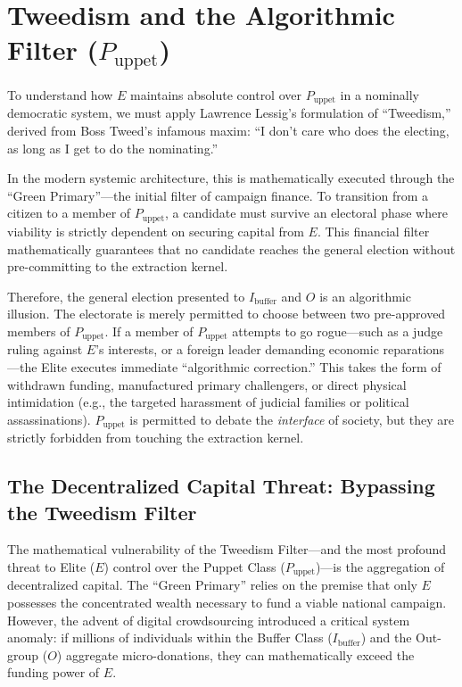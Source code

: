 \documentclass[12pt,openany]{book}
\begin{document}
\section{Tweedism and the Algorithmic Filter (\texorpdfstring{$P_{\text{uppet}}$}{P\_uppet})}

To understand how $E$ maintains absolute control over $P_{\text{uppet}}$ in a nominally democratic system, we must apply Lawrence Lessig's formulation of ``Tweedism,'' derived from Boss Tweed's infamous maxim: ``I don't care who does the electing, as long as I get to do the nominating.''

In the modern systemic architecture, this is mathematically executed through the ``Green Primary''---the initial filter of campaign finance. To transition from a citizen to a member of $P_{\text{uppet}}$, a candidate must survive an electoral phase where viability is strictly dependent on securing capital from $E$. This financial filter mathematically guarantees that no candidate reaches the general election without pre-committing to the extraction kernel.

Therefore, the general election presented to $I_{\text{buffer}}$ and $O$ is an algorithmic illusion. The electorate is merely permitted to choose between two pre-approved members of $P_{\text{uppet}}$. If a member of $P_{\text{uppet}}$ attempts to go rogue---such as a judge ruling against $E$'s interests, or a foreign leader demanding economic reparations---the Elite executes immediate ``algorithmic correction.'' This takes the form of withdrawn funding, manufactured primary challengers, or direct physical intimidation (e.g., the targeted harassment of judicial families or political assassinations). $P_{\text{uppet}}$ is permitted to debate the \textit{interface} of society, but they are strictly forbidden from touching the extraction kernel.

\subsection{The Decentralized Capital Threat: Bypassing the Tweedism Filter}

The mathematical vulnerability of the Tweedism Filter---and the most profound threat to Elite ($E$) control over the Puppet Class ($P_{\text{uppet}}$)---is the aggregation of decentralized capital. The ``Green Primary'' relies on the premise that only $E$ possesses the concentrated wealth necessary to fund a viable national campaign. However, the advent of digital crowdsourcing introduced a critical system anomaly: if millions of individuals within the Buffer Class ($I_{\text{buffer}}$) and the Out-group ($O$) aggregate micro-donations, they can mathematically exceed the funding power of $E$.
\end{document}
